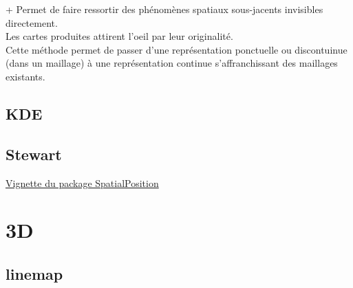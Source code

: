\documentclass[]{book}
\begin{document}
+ Permet de faire ressortir des phénomènes spatiaux sous-jacents invisibles directement.\\
Les cartes produites attirent l'oeil par leur originalité.\\
Cette méthode permet de passer d'une représentation ponctuelle ou discontuinue (dans un maillage) à une représentation continue s'affranchissant des maillages existants.

\hypertarget{kde}{%
\subsection{KDE}\label{kde}}

\hypertarget{stewart}{%
\subsection{Stewart}\label{stewart}}

\href{https://cran.r-project.org/web/packages/SpatialPosition/vignettes/StewartExample.html}{Vignette du package SpatialPosition}

\hypertarget{d}{%
\section{3D}\label{d}}

\hypertarget{linemap}{%
\subsection{linemap}\label{linemap}}
\end{document}
